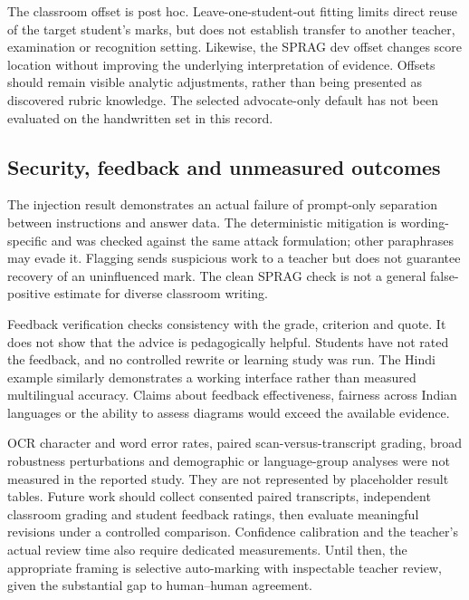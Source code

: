 The classroom offset is post hoc. Leave-one-student-out fitting limits direct reuse of the target student's marks, but does not establish transfer to another teacher, examination or recognition setting. Likewise, the SPRAG dev offset changes score location without improving the underlying interpretation of evidence. Offsets should remain visible analytic adjustments, rather than being presented as discovered rubric knowledge. The selected advocate-only default has not been evaluated on the handwritten set in this record.

\subsection{Security, feedback and unmeasured outcomes}
The injection result demonstrates an actual failure of prompt-only separation between instructions and answer data. The deterministic mitigation is wording-specific and was checked against the same attack formulation; other paraphrases may evade it. Flagging sends suspicious work to a teacher but does not guarantee recovery of an uninfluenced mark. The clean SPRAG check is not a general false-positive estimate for diverse classroom writing.

Feedback verification checks consistency with the grade, criterion and quote. It does not show that the advice is pedagogically helpful. Students have not rated the feedback, and no controlled rewrite or learning study was run. The Hindi example similarly demonstrates a working interface rather than measured multilingual accuracy. Claims about feedback effectiveness, fairness across Indian languages or the ability to assess diagrams would exceed the available evidence.

OCR character and word error rates, paired scan-versus-transcript grading, broad robustness perturbations and demographic or language-group analyses were not measured in the reported study. They are not represented by placeholder result tables. Future work should collect consented paired transcripts, independent classroom grading and student feedback ratings, then evaluate meaningful revisions under a controlled comparison. Confidence calibration and the teacher's actual review time also require dedicated measurements. Until then, the appropriate framing is selective auto-marking with inspectable teacher review, given the substantial gap to human--human agreement.
